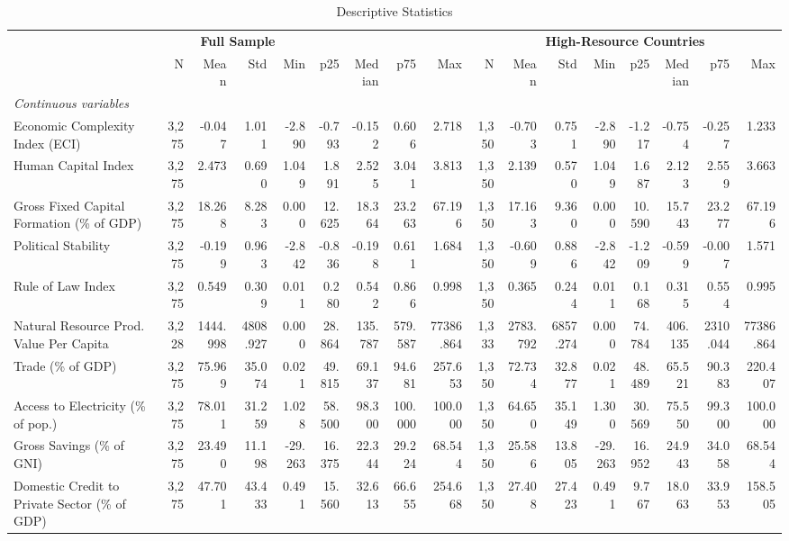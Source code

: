 \begin{table}[htbp]
\centering
\caption{Descriptive Statistics}
\label{tab:desc_stats}
\small
\setlength{\tabcolsep}{4pt}
\begin{tabular}{lrrrrrrrrrrrrrrrr}
\toprule
\multicolumn{9}{c}{\textbf{Full Sample}} & \multicolumn{8}{c}{\textbf{High-Resource Countries}} \\
\cmidrule(lr){2-9}\cmidrule(lr){10-17}
 & N & Mean & Std & Min & p25 & Median & p75 & Max & N & Mean & Std & Min & p25 & Median & p75 & Max \\
\midrule
\multicolumn{17}{l}{\textit{Continuous variables}} \\[2pt]
Economic Complexity Index (ECI) & 3,275 & -0.047 & 1.011 & -2.890 & -0.793 & -0.152 & 0.606 & 2.718 & 1,350 & -0.703 & 0.751 & -2.890 & -1.217 & -0.754 & -0.257 & 1.233 \\
Human Capital Index & 3,275 & 2.473 & 0.690 & 1.049 & 1.891 & 2.525 & 3.041 & 3.813 & 1,350 & 2.139 & 0.570 & 1.049 & 1.687 & 2.123 & 2.559 & 3.663 \\
Gross Fixed Capital Formation (\% of GDP) & 3,275 & 18.268 & 8.283 & 0.000 & 12.625 & 18.364 & 23.263 & 67.196 & 1,350 & 17.163 & 9.360 & 0.000 & 10.590 & 15.743 & 23.277 & 67.196 \\
Political Stability & 3,275 & -0.199 & 0.963 & -2.842 & -0.836 & -0.198 & 0.611 & 1.684 & 1,350 & -0.609 & 0.886 & -2.842 & -1.209 & -0.599 & -0.007 & 1.571 \\
Rule of Law Index & 3,275 & 0.549 & 0.309 & 0.011 & 0.280 & 0.542 & 0.866 & 0.998 & 1,350 & 0.365 & 0.244 & 0.011 & 0.168 & 0.315 & 0.554 & 0.995 \\
Natural Resource Prod. Value Per Capita & 3,228 & 1444.998 & 4808.927 & 0.000 & 28.864 & 135.787 & 579.587 & 77386.864 & 1,333 & 2783.792 & 6857.274 & 0.000 & 74.784 & 406.135 & 2310.044 & 77386.864 \\
Trade (\% of GDP) & 3,275 & 75.969 & 35.074 & 0.021 & 49.815 & 69.137 & 94.681 & 257.653 & 1,350 & 72.734 & 32.877 & 0.021 & 48.489 & 65.521 & 90.383 & 220.407 \\
Access to Electricity (\% of pop.) & 3,275 & 78.011 & 31.259 & 1.028 & 58.500 & 98.300 & 100.000 & 100.000 & 1,350 & 64.650 & 35.149 & 1.300 & 30.569 & 75.550 & 99.300 & 100.000 \\
Gross Savings (\% of GNI) & 3,275 & 23.490 & 11.198 & -29.263 & 16.375 & 22.344 & 29.224 & 68.544 & 1,350 & 25.586 & 13.805 & -29.263 & 16.952 & 24.943 & 34.058 & 68.544 \\
Domestic Credit to Private Sector (\% of GDP) & 3,275 & 47.701 & 43.433 & 0.491 & 15.560 & 32.613 & 66.655 & 254.668 & 1,350 & 27.408 & 27.423 & 0.491 & 9.767 & 18.063 & 33.953 & 158.505 \\

\end{tabular}
\end{table}
